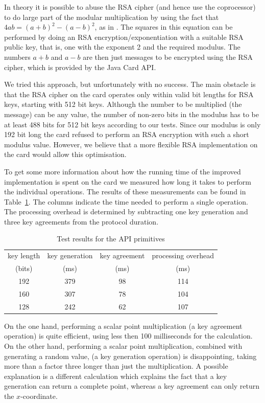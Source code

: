 In theory it is possible to abuse the RSA cipher (and hence use the coprocessor)
to do large part of the modular multiplication by using the fact that
$4ab = (a+b)^2 - (a-b)^2$, as in \cite{Sterckx09,TewsJacobs09}. The squares in
this equation can be performed by doing an RSA encryption\slash exponentiation
with a suitable RSA public key, that is, one with the exponent 2 and the
required modulus. The numbers $a+b$ and $a-b$ are then just messages to be
encrypted using the RSA cipher, which is provided by the Java Card API.

We tried this approach, but unfortunately with no success. The main obstacle is
that the RSA cipher on the card operates only within valid bit lengths for RSA
keys, starting with 512 bit keys. Although the number to be multiplied (the
message) can be any value, the number of non-zero bits in the modulus has to be
at least 488 bits for 512 bit keys according to our tests. Since our modulus is
only 192 bit long the card refused to perform an RSA encryption with such a
short modulus value. However, we believe that a more flexible RSA implementation
on the card would allow this optimisation.

To get some more information about how the running time of the improved
implementation is spent on the card we measured how long it takes to perform the
individual operations. The results of these measurements can be found in
Table~\ref{tab:primitives}. The columns indicate the time needed to perform a
single operation. The processing overhead is determined by subtracting one key
generation and three key agreements from the protocol duration.

\begin{table}
  \centering
  \caption{Test results for the API primitives}
  \label{tab:primitives}
  \renewcommand{\tabcolsep}{1.25mm}
  \renewcommand{\arraystretch}{1.25}
  \begin{tabular}{| c || c | c | c |}\hline
    key length & key generation & key agreement & processing overhead \\
    (bits) & (ms) & (ms) & (ms) \\\hline
    \hline
    192 & 379 & 98 & 114 \\\hline
    160 & 307 & 78 & 104 \\\hline
    128 & 242 & 62 & 107 \\\hline
  \end{tabular}
\end{table}

On the one hand, performing a scalar point multiplication (a key agreement
operation) is quite efficient, using less then 100 milliseconds for the
calculation. On the other hand, performing a scalar point multiplication,
combined with generating a random value, (a key generation operation) is
disappointing, taking more than a factor three longer than just the
multiplication. A possible explanation is a different calculation which explains
the fact that a key generation can return a complete point, whereas a key
agreement can only return the $x$-coordinate.

